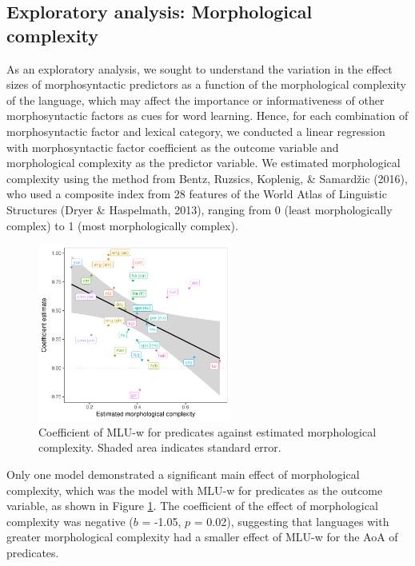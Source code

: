 \documentclass[10pt, letterpaper]{article}
\newenvironment{CodeChunk}{}{}
\begin{document}
\hypertarget{exploratory-analysis-morphological-complexity}{%
\subsection{Exploratory analysis: Morphological
complexity}\label{exploratory-analysis-morphological-complexity}}

As an exploratory analysis, we sought to understand the variation in the
effect sizes of morphosyntactic predictors as a function of the
morphological complexity of the language, which may affect the
importance or informativeness of other morphosyntactic factors as cues
for word learning. Hence, for each combination of morphosyntactic factor
and lexical category, we conducted a linear regression with
morphosyntactic factor coefficient as the outcome variable and
morphological complexity as the predictor variable. We estimated
morphological complexity using the method from Bentz, Ruzsics, Koplenig,
\& Samardžic (2016), who used a composite index from 28 features of the
World Atlas of Linguistic Structures (Dryer \& Haspelmath, 2013),
ranging from 0 (least morphologically complex) to 1 (most
morphologically complex).

\begin{CodeChunk}
\begin{figure}[ht]

{\centering \includegraphics[width=240px]{figs/mlu_pred-1} 

}

\caption[Coefficient of MLU-w for predicates against estimated morphological complexity]{Coefficient of MLU-w for predicates against estimated morphological complexity. Shaded area indicates standard error.}\label{fig:mlu_pred}
\end{figure}
\end{CodeChunk}

Only one model demonstrated a significant main effect of morphological
complexity, which was the model with MLU-w for predicates as the outcome
variable, as shown in Figure \ref{fig:mlu_pred}. The coefficient of the
effect of morphological complexity was negative (\(b\) = -1.05, \(p\) =
0.02), suggesting that languages with greater morphological complexity
had a smaller effect of MLU-w for the AoA of predicates.
\end{document}
